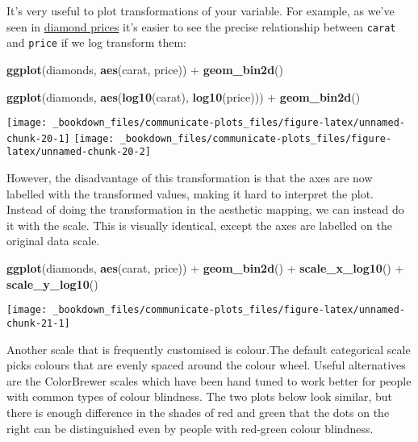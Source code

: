 \documentclass[]{book}
\newenvironment{Shaded}{\begin{snugshade}}{\end{snugshade}}
\newcommand{\KeywordTok}[1]{\textcolor[rgb]{0.13,0.29,0.53}{\textbf{{#1}}}}
\newcommand{\StringTok}[1]{\textcolor[rgb]{0.31,0.60,0.02}{{#1}}}
\newcommand{\NormalTok}[1]{{#1}}
\begin{document}
It's very useful to plot transformations of your variable. For example,
as we've seen in \href{diamond-prices}{diamond prices} it's easier to
see the precise relationship between \texttt{carat} and \texttt{price}
if we log transform them:

\begin{Shaded}
\begin{Highlighting}[]
\KeywordTok{ggplot}\NormalTok{(diamonds, }\KeywordTok{aes}\NormalTok{(carat, price)) +}
\StringTok{  }\KeywordTok{geom_bin2d}\NormalTok{()}

\KeywordTok{ggplot}\NormalTok{(diamonds, }\KeywordTok{aes}\NormalTok{(}\KeywordTok{log10}\NormalTok{(carat), }\KeywordTok{log10}\NormalTok{(price))) +}
\StringTok{  }\KeywordTok{geom_bin2d}\NormalTok{()}
\end{Highlighting}
\end{Shaded}

\texttt{[image: \_bookdown\_files/communicate-plots\_files/figure-latex/unnamed-chunk-20-1]}
\texttt{[image: \_bookdown\_files/communicate-plots\_files/figure-latex/unnamed-chunk-20-2]}

However, the disadvantage of this transformation is that the axes are
now labelled with the transformed values, making it hard to interpret
the plot. Instead of doing the transformation in the aesthetic mapping,
we can instead do it with the scale. This is visually identical, except
the axes are labelled on the original data scale.

\begin{Shaded}
\begin{Highlighting}[]
\KeywordTok{ggplot}\NormalTok{(diamonds, }\KeywordTok{aes}\NormalTok{(carat, price)) +}
\StringTok{  }\KeywordTok{geom_bin2d}\NormalTok{() +}\StringTok{ }
\StringTok{  }\KeywordTok{scale_x_log10}\NormalTok{() +}\StringTok{ }
\StringTok{  }\KeywordTok{scale_y_log10}\NormalTok{()}
\end{Highlighting}
\end{Shaded}

\begin{center}\texttt{[image: \_bookdown\_files/communicate-plots\_files/figure-latex/unnamed-chunk-21-1]} \end{center}

Another scale that is frequently customised is colour.The default
categorical scale picks colours that are evenly spaced around the colour
wheel. Useful alternatives are the ColorBrewer scales which have been
hand tuned to work better for people with common types of colour
blindness. The two plots below look similar, but there is enough
difference in the shades of red and green that the dots on the right can
be distinguished even by people with red-green colour blindness.
\end{document}
